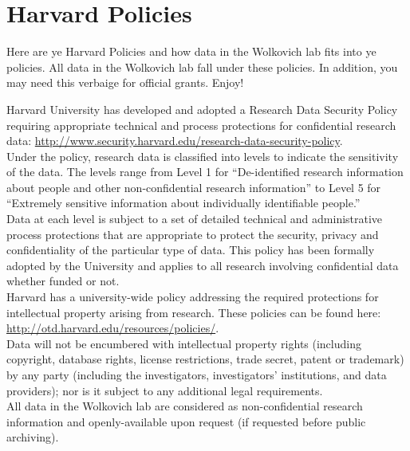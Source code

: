 \documentclass[11pt,a4paper,oneside]{article}
\begin{document}
\section {Harvard Policies}
Here are ye Harvard Policies and how data in the Wolkovich lab fits into ye policies. All data in the Wolkovich lab fall under these policies. In addition, you may need this verbaige for official grants. Enjoy!

\noindent Harvard University has developed and adopted a Research Data Security Policy requiring appropriate technical and process protections for confidential research data: \url{http://www.security.harvard.edu/research-data-security-policy}. \\

\noindent Under the policy, research data is classified into levels to indicate the sensitivity of the data.  The levels range from Level 1 for ``De-identified research information about people and other non-confidential research information'' to Level 5 for ``Extremely sensitive information about individually identifiable people.''\\

\noindent Data at each level is subject to a set of detailed technical and administrative process protections that are appropriate to protect the security, privacy and confidentiality of the particular type of data.  This policy has been formally adopted by the University and applies to all research involving confidential data whether funded or not.\\ 

\noindent  Harvard has a university-wide policy addressing the required protections for intellectual property arising from research.  These policies can be found here: \url{http://otd.harvard.edu/resources/policies/}.\\

\noindent Data will not be encumbered with intellectual property rights (including copyright, database rights, license restrictions, trade secret, patent or trademark) by any party (including the investigators, investigators' institutions, and data providers); nor is it subject to any additional legal
requirements.\\

\noindent All data in the Wolkovich lab are considered as non-confidential research information and openly-available upon request (if requested before public archiving). 

% 
\end{document}
